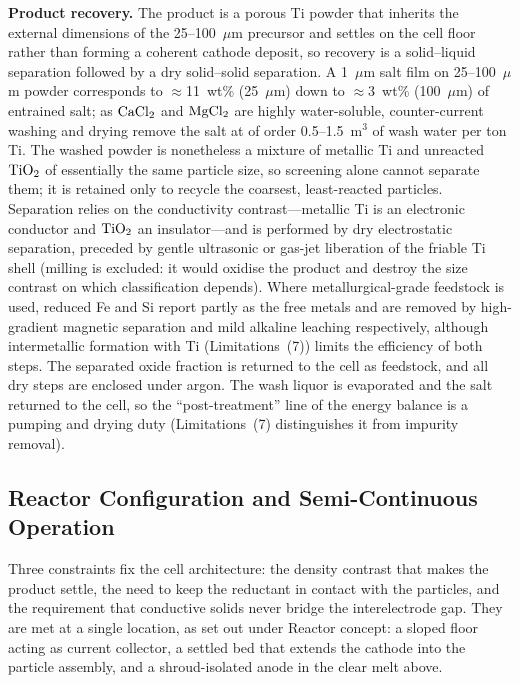 \documentclass[11pt]{article}
\begin{document}
\textbf{Product recovery.} The product is a porous Ti powder that inherits the external dimensions of the 25--100~$\mu$m precursor and settles on the cell floor rather than forming a coherent cathode deposit, so recovery is a solid--liquid separation followed by a dry solid--solid separation. A 1~$\mu$m salt film on 25--100~$\mu$m powder corresponds to $\approx$11~wt\% (25~$\mu$m) down to $\approx$3~wt\% (100~$\mu$m) of entrained salt; as $\ce{CaCl2}$ and $\ce{MgCl2}$ are highly water-soluble, counter-current washing and drying remove the salt at of order 0.5--1.5~m$^3$ of wash water per ton Ti. The washed powder is nonetheless a mixture of metallic Ti and unreacted $\ce{TiO2}$ of essentially the same particle size, so screening alone cannot separate them; it is retained only to recycle the coarsest, least-reacted particles. Separation relies on the conductivity contrast---metallic Ti is an electronic conductor and $\ce{TiO2}$ an insulator---and is performed by dry electrostatic separation, preceded by gentle ultrasonic or gas-jet liberation of the friable Ti shell (milling is excluded: it would oxidise the product and destroy the size contrast on which classification depends). Where metallurgical-grade feedstock is used, reduced Fe and Si report partly as the free metals and are removed by high-gradient magnetic separation and mild alkaline leaching respectively, although intermetallic formation with Ti (Limitations~(7)) limits the efficiency of both steps. The separated oxide fraction is returned to the cell as feedstock, and all dry steps are enclosed under argon. The wash liquor is evaporated and the salt returned to the cell, so the ``post-treatment'' line of the energy balance is a pumping and drying duty (Limitations~(7) distinguishes it from impurity removal).

\subsection*{Reactor Configuration and Semi-Continuous Operation}

Three constraints fix the cell architecture: the density contrast that makes the product settle, the need to keep the reductant in contact with the particles, and the requirement that conductive solids never bridge the interelectrode gap. They are met at a single location, as set out under Reactor concept: a sloped floor acting as current collector, a settled bed that extends the cathode into the particle assembly, and a shroud-isolated anode in the clear melt above.
\end{document}
